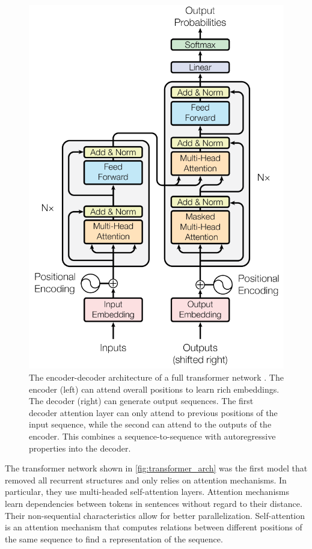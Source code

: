\documentclass[../main.tex]{subfiles}
\begin{document}
\begin{figure}[t]
    \centering
    \includegraphics[scale=0.4]{include/images/transformer_architecture.png}
    \caption{
        The encoder-decoder architecture
        of a full transformer network \cite{Vaswani2017}.
        The encoder (left) can attend overall positions to learn rich embeddings.
        The decoder (right) can generate output sequences.
        The first decoder attention layer
        can only attend to previous positions of the input sequence,
        while the second can attend to the outputs of the encoder.
        This combines a sequence-to-sequence with
        autoregressive properties into the decoder.
    }
    \label{fig:transformer_arch}
\end{figure}

The transformer network \cite{Vaswani2017}
shown in \autoref{fig:transformer_arch}
was the first model that removed all recurrent structures
and only relies on attention mechanisms.
In particular,
they use multi-headed self-attention layers.
Attention mechanisms learn dependencies between tokens in sentences
without regard to their distance.
Their non-sequential characteristics allow for better parallelization.
Self-attention is an attention mechanism
that computes relations between different positions of the same sequence
to find a representation of the sequence.
\end{document}
